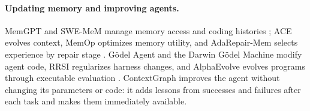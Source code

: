 \paragraph{Updating memory and improving agents.}
MemGPT and SWE-MeM manage memory access and coding histories
\citep{memgpt2023,swemem2026}; ACE evolves context, MemOp optimizes memory
utility, and AdaRepair-Mem selects experience by repair stage
\citep{ace2026,memop2026,adarepairmem2026}. G\"odel Agent and the Darwin
G\"odel Machine modify agent code, RRSI regularizes harness changes, and
AlphaEvolve evolves programs through executable evaluation
\citep{godelagent2025,dgm2026,rrsi2026,alphaevolve2025}. ContextGraph improves
the agent without changing its parameters or code: it adds lessons from
successes and failures after each task and makes them immediately available.
